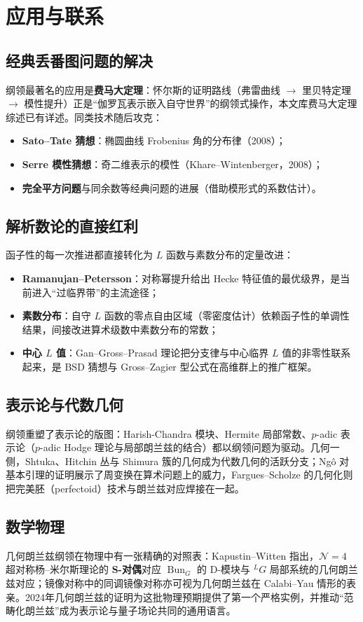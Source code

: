 \section{应用与联系}\label{sec:applications}

\subsection{经典丢番图问题的解决}

纲领最著名的应用是\textbf{费马大定理}：怀尔斯的证明路线（弗雷曲线 $\to$ 里贝特定理 $\to$ 模性提升）正是“伽罗瓦表示嵌入自守世界”的纲领式操作，本文库费马大定理综述已有详述。同类技术随后攻克：

\begin{itemize}
    \item \textbf{Sato--Tate 猜想}：椭圆曲线 Frobenius 角的分布律（2008）；
    \item \textbf{Serre 模性猜想}：奇二维表示的模性（Khare--Wintenberger，2008\cite{khare2009}）；
    \item \textbf{完全平方问题}与同余数等经典问题的进展（借助模形式的系数估计）。
\end{itemize}

\subsection{解析数论的直接红利}

函子性的每一次推进都直接转化为 $L$ 函数与素数分布的定量改进：

\begin{itemize}
    \item \textbf{Ramanujan--Petersson}：对称幂提升\cite{kimshahidi2002}给出 Hecke 特征值的最优级界，是当前进入“过临界带”的主流途径；
    \item \textbf{素数分布}：自守 $L$ 函数的零点自由区域（零密度估计）依赖函子性的单调性结果，间接改进算术级数中素数分布的常数；
    \item \textbf{中心 $L$ 值}：Gan--Gross--Prasad 理论\cite{ggp2012}把分支律与中心临界 $L$ 值的非零性联系起来，是 BSD 猜想与 Gross--Zagier 型公式在高维群上的推广框架。
\end{itemize}

\subsection{表示论与代数几何}

纲领重塑了表示论的版图：Harish-Chandra 模块、Hermite 局部常数、$p$-adic 表示论（$p$-adic Hodge 理论与局部朗兰兹的结合）都以纲领问题为驱动。几何一侧，Shtuka、Hitchin 丛与 Shimura 簇的几何成为代数几何的活跃分支；Ng\^o 对基本引理的证明\cite{ngo2010}展示了周变换在算术问题上的威力，Fargues--Scholze 的几何化\cite{fargues2021}则把完美胚（perfectoid）技术与朗兰兹对应焊接在一起。

\subsection{数学物理}

几何朗兰兹纲领在物理中有一张精确的对照表：Kapustin--Witten 指出，$\mathcal{N}=4$ 超对称杨--米尔斯理论的 \textbf{S-对偶}对应 $\operatorname{Bun}_G$ 的 D-模块与 $^LG$ 局部系统的几何朗兰兹对应；镜像对称中的同调镜像对称亦可视为几何朗兰兹在 Calabi--Yau 情形的表亲。2024年几何朗兰兹的证明\cite{gaitsgoryraskin2024}为这批物理预期提供了第一个严格实例，并推动“范畴化朗兰兹”成为表示论与量子场论共同的通用语言。
